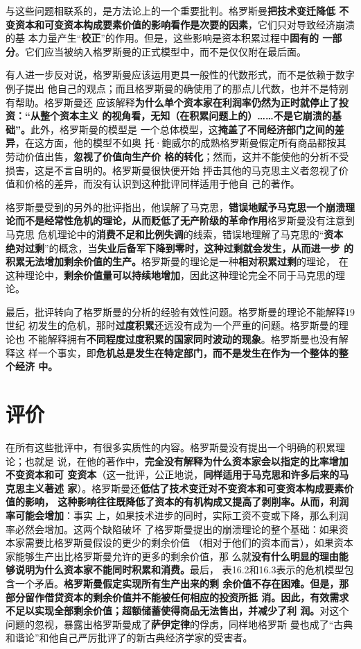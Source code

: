 与这些问题相联系的，是方法论上的一个重要批判。格罗斯曼\textbf{把技术变迁降低
不变资本和可变资本构成要素价值的影响看作是次要的因素}，它们只对导致经济崩溃的基
本力量产生“\textbf{校正}”的作用。但是，这些影响是资本积累过程中\textbf{固有的
一部分}。它们应当被纳入格罗斯曼的正式模型中，而不是仅仅附在最后面。

有人进一步反对说，格罗斯曼应该运用更具一般性的代数形式，而不是依赖于数字例子提出
他自己的观点；而且格罗斯曼的确使用了的那点儿代数，也并不是特别有帮助。格罗斯曼还
应该解释\textbf{为什么单个资本家在利润率仍然为正时就停止了投资：“从整个资本主义
  的视角看，无知（在积累问题上的）……不是它崩溃的基础”。}此外，格罗斯曼的模型是
一个总体模型，这\textbf{掩盖了不同经济部门之间的差异}，在这方面，他的模型不如奥
托·鲍威尔的成熟格罗斯曼假定所有商品都按其劳动价值出售，\textbf{忽视了价值向生产价
  格的转化}；然而，这并不能使他的分析不受损害，这是不言自明的。格罗斯曼很快便开始
抨击其他的马克思主义者忽视了价值和价格的差异，而没有认识到这种批评同样适用于他自
己的著作。

格罗斯曼受到的另外的批评指出，他误解了马克思，\textbf{错误地赋予马克思一个崩溃理
  论而不是经常性危机的理论，从而贬低了无产阶级的革命作用}格罗斯曼没有注意到马克思
危机理论中的\textbf{消费不足和比例失调}的线索，错误地理解了马克思的“\textbf{资本
  绝对过剩}”的概念，当\textbf{失业后备军下降到零时，这种过剩就会发生，从而进一步
  的积累无法增加剩余价值的生产。}格罗斯曼的理论是一种\textbf{相对积累过剩}的理论，
在这种理论中，\textbf{剩余价值量可以持续地增加}，因此这种理论完全不同于马克思的理
论。

最后，批评转向了格罗斯曼的分析的经验有效性问题。格罗斯曼的理论不能解释19世纪
初发生的危机，那时\textbf{过度积累}还远没有成为一个严重的问题。格罗斯曼的理论也
不能解释拥有\textbf{不同程度过度积累的国家同时波动的现象}。格罗斯曼也没有解释这
样一个事实，即\textbf{危机总是发生在特定部门，而不是发生在作为一个整体的整个经济
中。}


\section{评价}

在所有这些批评中，有很多实质性的内容。格罗斯曼没有提出一个明确的积累理论；也就是
说，在他的著作中，\textbf{完全没有解释为什么资本家会以指定的比率增加不变资本和可
  变资本}（这一批评，公正地说，\textbf{同样适用于马克思和许多后来的马克思主义著述
  家}）。格罗斯曼还\textbf{低估了技术变迁对不变资本和可变资本构成要素价值的影响，
  这种影响往往既降低了资本的有机构成又提高了剥削率。从而，利润率可能会增加}：事实
上，如果技术进步的同时，实际工资不变或下降，那么利润率必然会增加。这两个缺陷破坏
了格罗斯曼提出的崩溃理论的整个基础：如果资本家需要比格罗斯曼假设的更少的剩余价值
（相对于他们的资本而言），如果资本家能够生产出比格罗斯曼允许的更多的剩余价值，那
么就\textbf{没有什么明显的理由能够说明为什么资本家不能同时积累和消费。}最后，
表16.2和16.3表示的危机模型包含一个矛盾。\textbf{格罗斯曼假定实现所有生产出来的剩
  余价值不存在困难。但是，那部分留作借贷资本的剩余价值并不能被任何相应的投资所抵
  消。因此，有效需求不足以实现全部剩余价值；超额储蓄使得商品无法售出，并减少了利
  润。}对这个问题的忽视，暴露出格罗斯曼成了\textbf{萨伊定律}的俘虏，同样地格罗斯
曼也成了“古典和谐论”和他自己严厉批评了的新古典经济学家的受害者。

